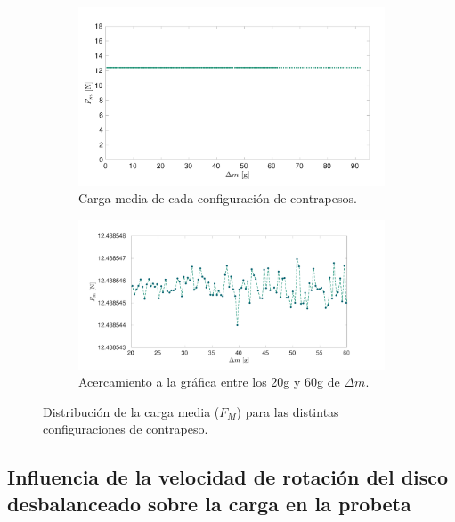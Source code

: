 \begin{figure}[H]
\centering
	\begin{subfigure}{1\linewidth}
		\centering
		\includegraphics[width=1\linewidth]{Imagenes/fm_dm.pdf}
		\caption{Carga media de cada configuración de contrapesos.}\label{fig:fm_dm}
	\end{subfigure}
	\begin{subfigure}{1\linewidth}
		\centering
		\includegraphics[width=1\linewidth]{Imagenes/fm_dmsp.pdf}
		\caption{Acercamiento a la gráfica entre los 20g y 60g de $\Delta m$. }\label{fig:fm_dmsp}
	\end{subfigure}
\par\bigskip
\caption{Distribución de la carga media ($F_M$) para las distintas configuraciones de contrapeso.}
\label{fig:velt_12}
\end{figure}

\newpage

\subsection{Influencia de la velocidad de rotación del disco desbalanceado sobre la carga en la probeta}

